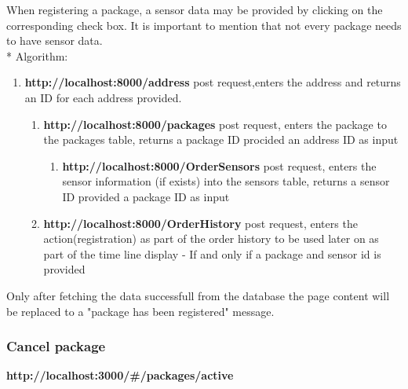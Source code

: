 When registering a package, a sensor data may be provided by clicking on the corresponding check box. It is important to mention that not every package needs to have sensor data.\\*
Algorithm:
\begin{enumerate}
  \item \textbf{http://localhost:8000/address} post request,enters the address and returns an ID for each address provided.
    \begin{enumerate}
        \item \textbf {http://localhost:8000/packages}  post request, enters the package to the packages table, returns a package ID procided an address ID as input
        \begin{enumerate}
        \item \textbf {http://localhost:8000/OrderSensors}  post request, enters the sensor information (if exists)  into the sensors table, returns a sensor ID provided a package ID as input
        \end{enumerate}
    \item \textbf {http://localhost:8000/OrderHistory}  post request, enters the action(registration) as part of the order history to be used later on as part of the time line display - If and only if a package and sensor id is provided\\
    \end{enumerate}
\end{enumerate}

Only after fetching the data successfull from the database the page content will be replaced to a "package has been registered" message.


\subsubsection{Cancel package}
\textbf{http://localhost:3000/#/packages/active}\\

